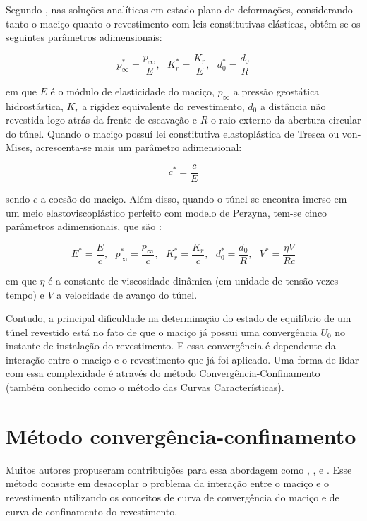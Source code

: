 Segundo , nas soluções analíticas em estado plano de deformações, considerando tanto o maciço quanto o revestimento com leis constitutivas elásticas, obtêm-se os seguintes parâmetros adimensionais:

\begin{equation}
	p_\infty^* = \frac{p_\infty}{E},~~~ K_r^* = \frac{K_r}{E},~~~ d_0^* = \frac{d_0}{R} 
\end{equation}

em que $E$ é o módulo de elasticidade do maciço, $p_\infty$ a pressão geostática hidrostástica, $K_r$ a rigidez equivalente do revestimento, $d_0$ a distância não revestida logo atrás da frente de escavação e $R$ o raio externo da abertura circular do túnel. Quando o maciço possuí lei constitutiva elastoplástica de Tresca ou von-Mises, acrescenta-se mais um parâmetro adimensional:

\begin{equation}
	c^* = \frac{c}{E} 
\end{equation}

sendo $c$ a coesão do maciço. Além disso, quando o túnel se encontra imerso em um meio elastoviscoplástico perfeito com modelo de Perzyna, tem-se cinco parâmetros adimensionais, que são \cite[p. 198]{Bernaud1991}:

\begin{equation}
	\label{eq:parametros_admensionais_vp}
	E^* = \frac{E}{c},~~~ p_\infty^* = \frac{p_\infty}{c},~~~ K_r^* = \frac{K_r}{c},~~~ d_0^* = \frac{d_0}{R},~~~ V^*=\frac{\eta V}{Rc}
\end{equation}

em que $\eta$ é a constante de viscosidade dinâmica (em unidade de tensão vezes tempo) e $V$ a velocidade de avanço do túnel.

Contudo, a principal dificuldade na determinação do estado de equilíbrio de um túnel revestido está no fato de que o maciço já possui uma convergência $U_0$ no instante de instalação do revestimento. E essa convergência é dependente da interação entre o maciço e o revestimento que já foi aplicado. Uma forma de lidar com essa complexidade é através do método Convergência-Confinamento (também conhecido como o método das Curvas Características).

\section{Método convergência-confinamento}
\label{cap:Método convergência-confinamento}
Muitos autores propuseram contribuições para essa abordagem como , ,  e . Esse método consiste em desacoplar o problema da interação entre o maciço e o revestimento utilizando os conceitos de curva de convergência do maciço e de curva de confinamento do revestimento. 

